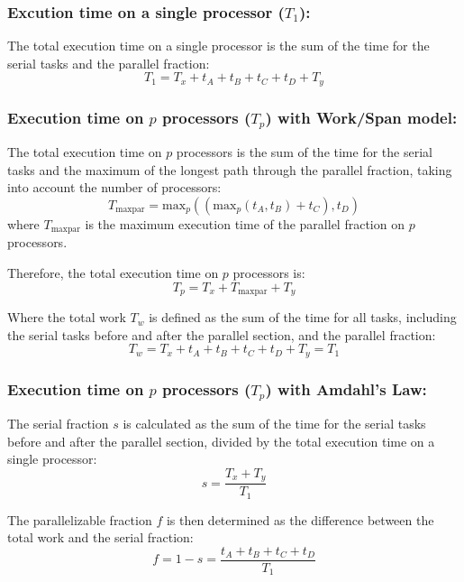 \documentclass[
  a4paper, %
]{kaohandt}
\begin{document}
\subsubsection*{Excution time on a single processor ($T_1$):}
The total execution time on a single processor is the sum of the time for the serial tasks and the parallel fraction:
\begin{equation}
  T_1 = T_x + t_A + t_B + t_C + t_D + T_y
\end{equation}

\subsubsection*{Execution time on $p$ processors ($T_p$) with Work/Span model:}
The total execution time on $p$ processors is the sum of the time for the serial tasks and the maximum of the longest path through the parallel fraction, taking into account the number of processors:
\begin{equation}
  T_{\text{maxpar}} = \text{max}_{p}((\text{max}_{p}(t_A, t_B) + t_C), t_D)
\end{equation}
where $T_{\text{maxpar}}$ is the maximum execution time of the parallel fraction on $p$ processors.

Therefore, the total execution time on $p$ processors is:
\begin{equation}
  T_p = T_x + T_{\text{maxpar}} + T_y
\end{equation}

Where the total work $T_w$ is defined as the sum of the time for all tasks, including the serial tasks before and after the parallel section, and the parallel fraction:
\begin{equation}
  T_w = T_x + t_A + t_B + t_C + t_D + T_y = T_1
\end{equation}

\subsubsection*{Execution time on $p$ processors ($T_p$) with Amdahl's Law:}
The serial fraction $s$ is calculated as the sum of the time for the serial tasks before and after the parallel section, divided by the total execution time on a single processor:
\begin{equation}
  s = \frac{T_x + T_y}{T_1}
\end{equation}

The parallelizable fraction $f$ is then determined as the difference between the total work and the serial fraction:
\begin{equation}
  f = 1 - s = \frac{t_A + t_B + t_C + t_D}{T_1}
\end{equation}
\end{document}
